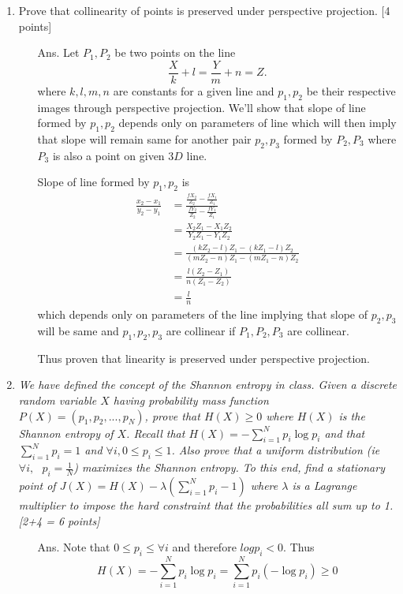 \documentclass[11pt]{article}
\begin{document}
\begin{enumerate}
\item Prove that collinearity of points is preserved under perspective projection. \textsf{[4 points]} 

\begin{itemize}
\item[Ans.] Let $P_1,P_2$ be two points on the line \[
\frac{X}{k}+l = \frac{Y}{m}+n = Z.
\]
where $k,l,m,n$ are constants for a given line and $p_1,p_2$ be their respective images through perspective projection.
 We'll show that slope of line formed by $p_1,p_2$ depends only on parameters of line which will then imply that slope will remain same for another pair $p_2,p_3$ formed by $P_2,P_3$ where $P_3$ is also a point on given $3D$ line. 


Slope of line formed by $p_1,p_2$ is 
\begin{align}
\frac{x_2-x_1}{y_2-y_1} &= \frac{\frac{f X_2}{Z_2}-\frac{f X_1}{Z_1}}{\frac{f Y_2}{Z_2}-\frac{f Y_1}{Z_1}} \\ 
 &= \frac{X_2 Z_1 - X_1 Z_2}{Y_2 Z_1 - Y_1 Z_2} \\ 
 &= \frac{(kZ_2-l)Z_1 - (kZ_1-l)Z_2}{(mZ_2-n)Z_1 - (mZ_1-n)Z_2}\\
 &= \frac{l(Z_2-Z_1)}{n(Z_1-Z_2)}\\
 &= \frac{l}{n}
\end{align}
which depends only on parameters of the line implying that slope of $p_2,p_3$ will be same and $p_1,p_2,p_3$ are collinear if $P_1,P_2,P_3$ are collinear.

Thus proven that linearity is preserved under perspective projection.
\end{itemize}

\item \textit{We have defined the concept of the Shannon entropy in class. Given a discrete random variable $X$ having probability mass function $P(X) = (p_1, p_2, ..., p_N)$, prove that $H(X) \geq 0$ where $H(X)$ is the Shannon entropy of $X$. Recall that $H(X) = -\sum\limits_{i=1}^N p_i \log p_i$ and that $\sum\limits_{i=1}^N p_i = 1$ and $\forall i, 0 \leq p_i \leq 1$. Also prove that a uniform distribution (\textit{ie} $\forall i, \textrm{ } p_i = \frac{1}{N}$) maximizes the Shannon entropy. To this end, find a stationary point of $J(X) = H(X) - \lambda (\sum\limits_{i=1}^N p_i - 1)$ where $\lambda$ is a Lagrange multiplier to impose the hard constraint that the probabilities all sum up to 1.  \textsf{[2+4 = 6 points]}}

\begin{itemize}
\item[Ans.] Note that $0 \leq p_i \leq  \forall i$ and therefore $log p_i<0$. Thus  \[
H(X) = -\sum\limits_{i=1}^N p_i \log p_i
 = \sum\limits_{i=1}^N p_i (-\log p_i)
 \geq 0
\]


\end{itemize}
\end{enumerate}
\end{document}
